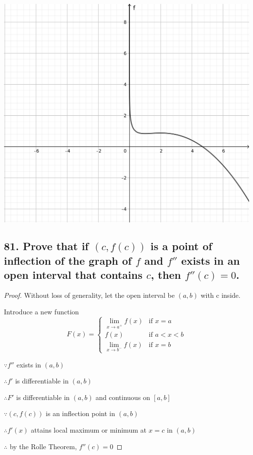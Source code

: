 \documentclass{article}
\begin{document}
\begin{enumerate}[(a)]
        \includegraphics[scale = 0.6]{50.png}

    \end{enumerate}

    \subsection*{81. Prove that if $(c, f(c))$ is a point of inflection of the graph of $f$ and $f''$ exists in an open interval that contains $c$, then $f''(c) = 0$.}

    \begin{proof}
        Without loss of generality, let the open interval be $(a, b)$ with c inside.

        Introduce a new function $$F(x) = \left\{ \begin{array}{ll}
            \lim_{x \to a^+} f(x) & \textrm{if $x = a$} \\
            f(x) & \textrm{if $a < x < b$} \\
            \lim_{x \to b^-} f(x) & \textrm{if $x = b$}
        \end{array} \right.$$

        $\because f''$ exists in $(a,b)$

        $\therefore f'$ is differentiable in $(a,b)$ 

        $\therefore F'$ is differentiable in $(a,b)$ and continuous on $[a,b]$ 

        $\because (c, f(c))$ is an inflection point in $(a,b)$

        $\therefore f'(x)$ attains local maximum or minimum at $x = c$ in $(a,b)$

        $\therefore $ by the Rolle Theorem, $f''(c) = 0$
    \end{proof}
\end{document}
